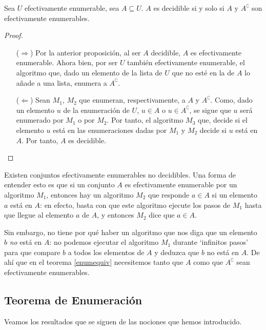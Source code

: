 \begin{theorem*}\label{enumequiv}
Sea $U$ efectivamente enumerable, sea $A\subseteq U$. $A$ es decidible si y solo si $A$ y $A^{\complement}$ son efectivamente enumerables.
\end{theorem*}
\begin{proof}\mbox{}
\begin{itemize}
    \item[($\Longrightarrow$)] Por la anterior proposición, al ser $A$ decidible, $A$ es efectivamente enumerable. Ahora bien, por ser $U$ también efectivamente enumerable, el algoritmo que, dado un elemento de la lista de $U$ que no esté en la de $A$ lo añade a una lista, enumera a $A^{\complement}$.
    \item[($\Longleftarrow$)] Sean $M_1$, $M_2$ que enumeran, respectivamente, a $A$ y $A^{\complement}$. Como, dado un elemento $u$ de la enumeración de $U$, $u \in A$ o $u \in A^{\complement}$, se sigue que $u$ será enumerado por $M_1$ o por $M_2$. Por tanto, el algoritmo $M_3$ que, decide si el elemento $u$ está en las enumeraciones dadas por $M_1$ y $M_2$ decide si $u$ está en $A$. Por tanto, $A$ es decidible.
\end{itemize}
\end{proof}

\begin{note}
Existen conjuntos efectivamente enumerables no decidibles. Una forma de entender esto es que si un conjunto $A$ es efectivamente enumerable por un algoritmo $M_1$, entonces hay un algoritmo $M_2$ que responde $a\in A$ si un elemento $a$ está en $A$: en efecto, basta con que este algoritmo ejecute los pasos de $M_1$ hasta que llegue al elemento $a$ de $A$, y entonces $M_2$ dice que  $a\in A$.

Sin  embargo, no tiene por qué haber un algoritmo que nos diga que un  elemento $b$ \textit{no} está en $A$: no podemos ejecutar el algoritmo $M_1$ durante `infinitos pasos' para  que compare $b$ a  todos los elementos de $A$ y deduzca que $b$ no está  en $A$. De ahí que en el teorema \ref{enumequiv} necesitemos  tanto  que $A$  como que $A^{\complement}$ sean efectivamente enumerables.
\end{note}

\subsection{Teorema de Enumeración}

Veamos los resultados que se siguen de las nociones que hemos introducido. 

